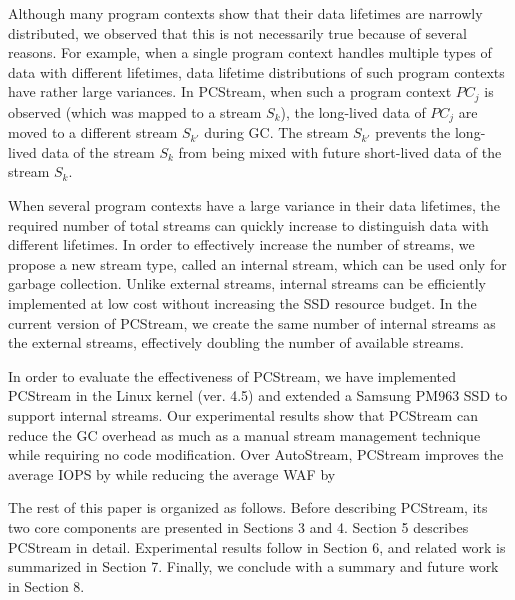 Although many program contexts show that their data lifetimes are narrowly
distributed, we observed that this is not necessarily true because of several
reasons.  For example, when a single program context handles multiple types of
data with different lifetimes, data lifetime distributions of such program
contexts  have rather large variances.  In \textsf{\small PCStream}, when such
a program context {\it $PC_j$} is observed (which was mapped to a stream {\it
$S_k$}), the long-lived data of {\it $PC_j$} are moved to a different stream
{\it $S_{k'}$} during GC.  The stream {\it $S_{k'}$} prevents the long-lived
data of the stream {\it $S_k$} from being mixed with future short-lived data of
the stream {\it $S_k$}.

When several program contexts have a large variance in their data lifetimes,
the required number of total streams can quickly increase to distinguish data
with different lifetimes.
In order to effectively increase the number of streams, we propose a new stream
type, called an internal stream, which can be used only for garbage collection.
Unlike external streams, internal streams can be efficiently implemented at low
cost without increasing the SSD resource budget.  In the current version of
\textsf{\small PCStream}, we create the same number of internal streams as the
external streams, effectively doubling the number of available streams. 

In order to evaluate the effectiveness of \textsf{\small PCStream}, we have
implemented \textsf{\small PCStream} in the Linux kernel (ver. 4.5) and
extended a Samsung PM963 SSD to support internal streams.  Our experimental
results show that \textsf{\small PCStream} can reduce the GC overhead as much
as a manual stream management technique while requiring no code modification.
Over \textsf{\small AutoStream}, \textsf{\small PCStream} improves the average
IOPS by  while reducing the average WAF by 

The rest of this paper is organized as follows.  
Before describing \textsf{\small PCStream}, its two
core components are presented in Sections 3 and 4.  Section 5 describes
\textsf{\small PCStream} in detail.  Experimental results follow in Section 6,
and related work is summarized in Section 7.  Finally, we conclude with a
summary and future work in Section 8.

